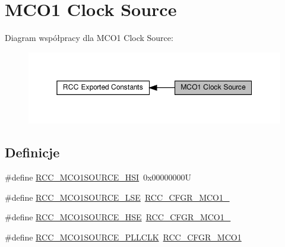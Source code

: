 \hypertarget{group___r_c_c___m_c_o1___clock___source}{}\section{M\+C\+O1 Clock Source}
\label{group___r_c_c___m_c_o1___clock___source}
Diagram współpracy dla M\+C\+O1 Clock Source\+:\nopagebreak
\begin{figure}[H]
\begin{center}
\leavevmode
\includegraphics[width=350pt]{group___r_c_c___m_c_o1___clock___source}
\end{center}
\end{figure}
\subsection*{Definicje}
\begin{DoxyCompactItemize}
\item 
\#define \hyperlink{group___r_c_c___m_c_o1___clock___source_gad99c388c455852143220397db3730635}{R\+C\+C\+\_\+\+M\+C\+O1\+S\+O\+U\+R\+C\+E\+\_\+\+H\+SI}~0x00000000U
\item 
\#define \hyperlink{group___r_c_c___m_c_o1___clock___source_gaa01b6cb196df3a4ad690f8bcaa4d0621}{R\+C\+C\+\_\+\+M\+C\+O1\+S\+O\+U\+R\+C\+E\+\_\+\+L\+SE}~\hyperlink{group___peripheral___registers___bits___definition_gafe73b3ad484eeecfa1556021677ecf4a}{R\+C\+C\+\_\+\+C\+F\+G\+R\+\_\+\+M\+C\+O1\+\_}
\item 
\#define \hyperlink{group___r_c_c___m_c_o1___clock___source_ga5582d2ab152eb440a6cc3ae4833b043f}{R\+C\+C\+\_\+\+M\+C\+O1\+S\+O\+U\+R\+C\+E\+\_\+\+H\+SE}~\hyperlink{group___peripheral___registers___bits___definition_ga1c7e8d1da534f052ce835f06227a9b7a}{R\+C\+C\+\_\+\+C\+F\+G\+R\+\_\+\+M\+C\+O1\+\_}
\item 
\#define \hyperlink{group___r_c_c___m_c_o1___clock___source_ga79d888f2238eaa4e4b8d02b3900ea18b}{R\+C\+C\+\_\+\+M\+C\+O1\+S\+O\+U\+R\+C\+E\+\_\+\+P\+L\+L\+C\+LK}~\hyperlink{group___peripheral___registers___bits___definition_ga26eb4a66eeff0ba17e9d2a06cf937ca4}{R\+C\+C\+\_\+\+C\+F\+G\+R\+\_\+\+M\+C\+O1}
\end{DoxyCompactItemize}


